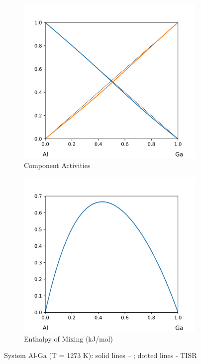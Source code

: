 \documentclass[12pt,abstract]{scrartcl}
\begin{document}
\begin{figure}
\centering
\begin{subfigure}{.5\textwidth}
  \centering
  \includegraphics[width=1\linewidth]{Al-Ga_Activity}
  \caption{Component Activities}
  \label{fig:sub1}
\end{subfigure}%
\begin{subfigure}{.5\textwidth}
  \centering
  \includegraphics[width=1\linewidth]{Al-Ga_Enthalpy}
  \caption{Enthalpy of Mixing (kJ/mol)}
  \label{fig:sub2}
\end{subfigure}
\caption{System Al-Ga (T = 1273 K): solid lines -- \cite{Al-Ga_Data}; dotted lines - TISR}
\label{fig:Al-Ga}
\end{figure}
\end{document}
